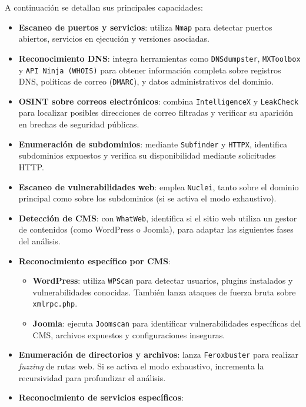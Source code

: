 \begin{parskipenv}
A continuación se detallan sus principales capacidades:

\begin{itemize}
  \item \textbf{Escaneo de puertos y servicios}: utiliza \texttt{Nmap} para detectar puertos abiertos, servicios en ejecución y versiones asociadas.
  \item \textbf{Reconocimiento DNS}: integra herramientas como \texttt{DNSdumpster}, \texttt{MXToolbox} y \texttt{API Ninja (WHOIS)} para obtener información completa sobre registros DNS, políticas de correo (\texttt{DMARC}), y datos administrativos del dominio.
  \item \textbf{OSINT sobre correos electrónicos}: combina \texttt{IntelligenceX} y \texttt{LeakCheck} para localizar posibles direcciones de correo filtradas y verificar su aparición en brechas de seguridad públicas.
  \item \textbf{Enumeración de subdominios}: mediante \texttt{Subfinder} y \texttt{HTTPX}, identifica subdominios expuestos y verifica su disponibilidad mediante solicitudes HTTP.
  \item \textbf{Escaneo de vulnerabilidades web}: emplea \texttt{Nuclei}, tanto sobre el dominio principal como sobre los subdominios (si se activa el modo exhaustivo).
  \item \textbf{Detección de CMS}: con \texttt{WhatWeb}, identifica si el sitio web utiliza un gestor de contenidos (como WordPress o Joomla), para adaptar las siguientes fases del análisis.
  \item \textbf{Reconocimiento específico por CMS}:
    \begin{itemize}
        \item \textbf{WordPress}: utiliza \texttt{WPScan} para detectar usuarios, plugins instalados y vulnerabilidades conocidas. También lanza ataques de fuerza bruta sobre \texttt{xmlrpc.php}.
        \item \textbf{Joomla}: ejecuta \texttt{Joomscan} para identificar vulnerabilidades específicas del CMS, archivos expuestos y configuraciones inseguras.
    \end{itemize}
  \item \textbf{Enumeración de directorios y archivos}: lanza \texttt{Feroxbuster} para realizar \textit{fuzzing} de rutas web. Si se activa el modo exhaustivo, incrementa la recursividad para profundizar el análisis.
  \item \textbf{Reconocimiento de servicios específicos}:
    \begin{itemize}

\end{itemize}
\end{itemize}
\end{parskipenv}
